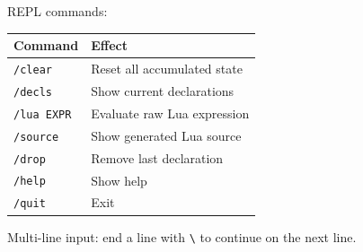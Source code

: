\documentclass[11pt,a4paper]{article}
\begin{document}
REPL commands:
\begin{tabular}{@{}ll@{}}
\toprule
\textbf{Command} & \textbf{Effect} \\
\midrule
\texttt{/clear}  & Reset all accumulated state \\
\texttt{/decls}  & Show current declarations \\
\texttt{/lua EXPR} & Evaluate raw Lua expression \\
\texttt{/source} & Show generated Lua source \\
\texttt{/drop}   & Remove last declaration \\
\texttt{/help}   & Show help \\
\texttt{/quit}   & Exit \\
\bottomrule
\end{tabular}

\medskip
Multi-line input: end a line with \texttt{\textbackslash} to continue on the next line.
\end{document}
